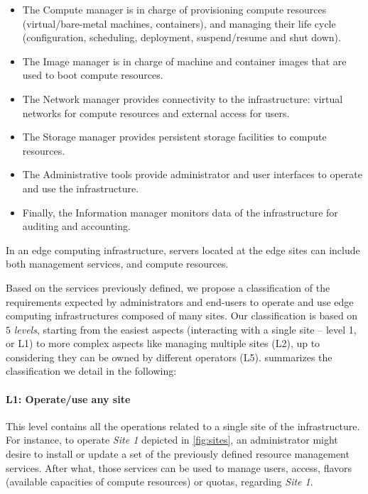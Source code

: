 \begin{itemize}
  \item The Compute manager is in charge of provisioning compute resources
    (\ie virtual/bare-metal machines, containers), and managing their life cycle
    (\eg configuration, scheduling, deployment, suspend/resume and shut down).
  \item The Image manager is in charge of machine and container images that are
    used to boot compute resources.
  \item The Network manager provides connectivity to the infrastructure:
    virtual networks for compute resources and external access for users.
  \item The Storage manager provides persistent storage facilities to
    compute resources.
  \item The Administrative tools provide administrator and user interfaces to
    operate and use the infrastructure.
  \item Finally, the Information manager monitors data of the infrastructure for
    auditing and accounting.
\end{itemize}

In an edge computing infrastructure, servers located at the edge sites can
include both management services, and compute resources.

Based on the services previously defined, we propose a classification of the
requirements expected by administrators and end-users to operate and use edge
computing infrastructures composed of many sites. Our classification is based
on $5$ \emph{levels}, starting from the easiest aspects (\ie interacting with
a single site -- level 1, or L1) to more complex aspects like managing multiple
sites (L2), up to considering they can be owned by different operators (L5).
 summarizes the classification we detail in the
following:

\paragraph{L1: Operate/use any site}
This level contains all the operations related to a single site of the
infrastructure. For instance, to operate \emph{Site 1} depicted in
\cref{fig:sites}, an administrator might desire to install or update a set of
the previously defined resource management services. After what, those
services can be used to manage users, access, flavors (\ie available
capacities of compute resources) or quotas, regarding \emph{Site 1}.

